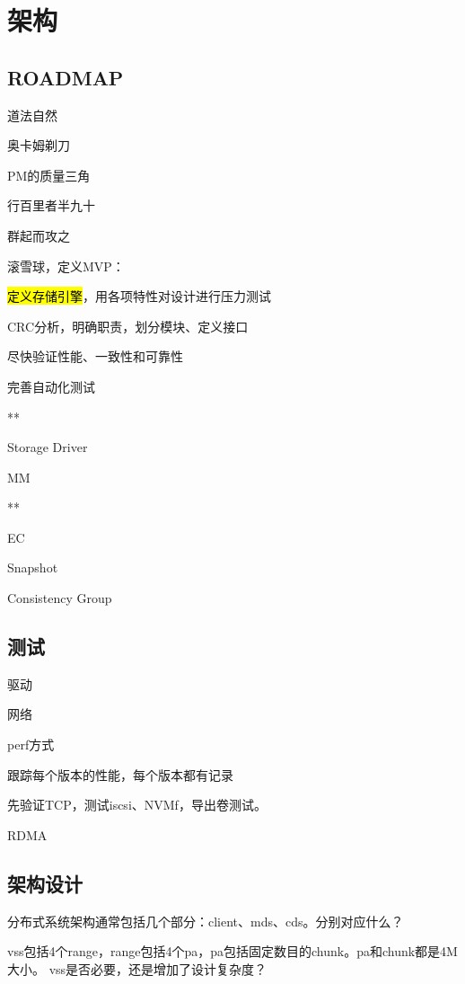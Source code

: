 \chapter{架构}

\section{ROADMAP}

道法自然

奥卡姆剃刀

PM的质量三角

行百里者半九十

群起而攻之

滚雪球，定义MVP：
\begin{enumbox}
\item \hl{定义存储引擎}，用各项特性对设计进行压力测试
\item CRC分析，明确职责，划分模块、定义接口
\item 尽快验证性能、一致性和可靠性
\item 完善自动化测试
\item ***
\item Storage Driver
\item MM
\item ***
\item EC
\item Snapshot
\item Consistency Group
\end{enumbox}

\section{测试}

驱动

网络

perf方式

跟踪每个版本的性能，每个版本都有记录

先验证TCP，测试iscsi、NVMf，导出卷测试。

RDMA

\section{架构设计}

分布式系统架构通常包括几个部分：client、mds、cds。分别对应什么？

vss包括4个range，range包括4个pa，pa包括固定数目的chunk。pa和chunk都是4M大小。
vss是否必要，还是增加了设计复杂度？

